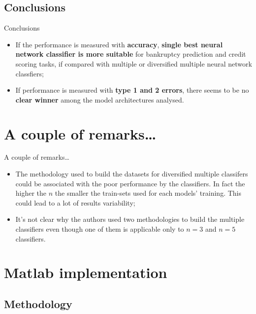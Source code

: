 \documentclass[12pt]{beamer}
\begin{document}
\subsection{Conclusions}

\begin{frame}{Conclusions}
  \begin{itemize}
    \item If the performance is measured with \textbf{accuracy}, \textbf{single best neural
      network classifier is more suitable} for bankruptcy
      prediction and credit scoring tasks, if compared with multiple or diversified
      multiple neural network classfiers;
    \item If performance is measured with \textbf{type 1 and 2 errors}, there seems
      to be no \textbf{clear winner} among the model architectures analysed.
  \end{itemize}
\end{frame}

\section{A couple of remarks\dots}

\begin{frame}{A couple of remarks\dots}
  \begin{itemize}
    \item The methodology used to build the datasets for diversified multiple classifers
      could be associated with the poor performance by the classifiers. In fact
      the higher the $n$ the smaller the train-sets used for each models' training.
      This could lead to a lot of results variability;
    \item It's not clear why the authors used two methodologies to build the multiple
      classifiers even though one of them is applicable only to $n=3$ and $n=5$
      classifiers.
  \end{itemize}
\end{frame}

\section{Matlab implementation}

\subsection{Methodology}
\end{document}
